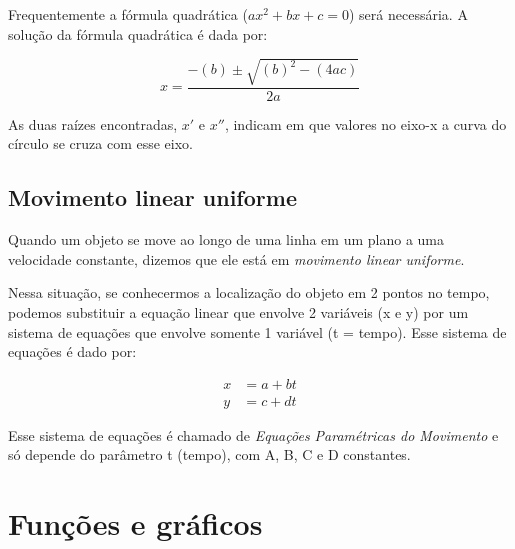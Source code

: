 \documentclass[pdftex, brazil, 12pt, twoside]{article}
\begin{document}
Frequentemente a fórmula quadrática ($ax^2 + bx + c = 0$) será necessária. A
solução da fórmula quadrática é dada por:

\begin{equation}
  x = \frac{-(b) \pm \sqrt{(b)^2 - (4ac)}}{2a}
\end{equation}

As duas raízes encontradas, $x'$ e $x''$, indicam em que valores no eixo-x a
curva do círculo se cruza com esse eixo.

\subsection{Movimento linear uniforme}
\label{modelagem-linear-movimento-uniforme}

Quando um objeto se move ao longo de uma linha em um plano a uma velocidade constante,
dizemos que ele está em \emph{movimento linear uniforme}.

Nessa situação, se
conhecermos a localização do objeto em 2 pontos no tempo, podemos substituir a equação
linear que envolve 2 variáveis (x e y) por um sistema de equações que envolve somente 1
variável (t = tempo). Esse sistema de equações é dado por:

\begin{equation}
  \begin{split}
    x &= a + bt\\
    y &= c + dt
  \end{split}
\end{equation}

Esse sistema de equações é chamado de \emph{Equações Paramétricas do Movimento} e só
depende do parâmetro t (tempo), com A, B, C e D constantes.


\section{Funções e gráficos}
\label{funcoes-graficos}

\end{document}
